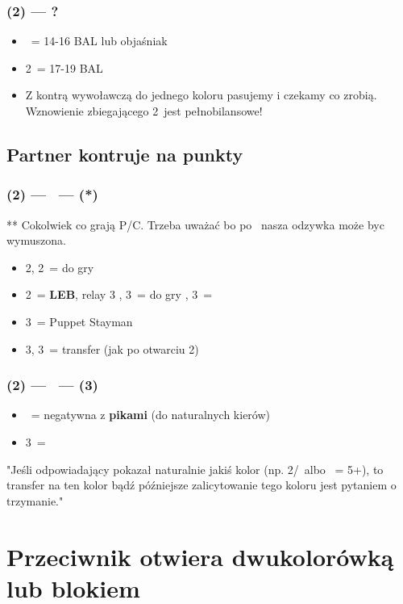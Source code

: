 \documentclass[12pt, a4paper]{article}
\newcommand{\leb}{\color{CadetBlue}\textbf{LEB}\color{black}}
\newcommand*\link[1]{\hspace*{0em plus 1fill}\makebox{#1}}
\newcommand{\imp}{\color{BurntOrange}\link{\textbf{\large!}}\color{black}}
\newcommand{\vimp}{\color{OrangeRed}\link{\textbf{\large{!!}}}\color{black}}
\begin{document}
\subsubsection*{(2\diams*) --- ?}
\begin{itemize}
    \item \dbl\ = 14-16 BAL lub objaśniak \vimp
    \item 2\nt\ = 17-19 BAL
    \br
    \item Z kontrą wywoławczą do jednego koloru pasujemy i czekamy co zrobią.
    Wznowienie zbiegającego 2\hearts\ jest pełnobilansowe!
\end{itemize}

\subsection*{Partner kontruje na punkty \vimp} 
\subsubsection*{(2\diams*) --- \dbl\ --- (\rdbl**)}
** Cokolwiek co grają P/C. Trzeba uważać bo po \pass\ nasza odzywka może byc wymuszona.
\begin{itemize}
    \item 2\hearts, 2\spades\ = do gry
    \item 2\nt\ = \leb, relay 3\clubs
    \subitem \pass, 3\diams\ = do gry
    \hearts, 3\spades\ = \inv
    \item 3\clubs\ = Puppet Stayman \imp
    \item 3\diams, 3\hearts\ = transfer (jak po otwarciu 2\nt)
\end{itemize}

\subsubsection*{(2\diams*) --- \dbl\ --- (3\hearts)}
\begin{itemize}
    \item \dbl\ = negatywna z \textbf{pikami} (do naturalnych kierów)
    \item 3\spades\ = \gf
\end{itemize}

"Jeśli odpowiadający pokazał naturalnie jakiś kolor (np. 2\hearts/\spades\ albo \pass\ = 5+\diams),
 to transfer na ten kolor bądź późniejsze zalicytowanie tego koloru jest pytaniem o trzymanie."


 \pagebreak
\section{Przeciwnik otwiera dwukolorówką lub blokiem}
\end{document}
